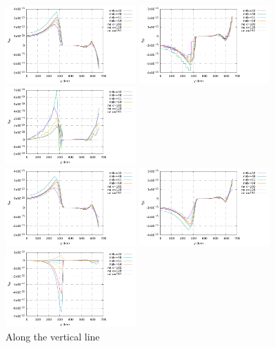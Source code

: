 \begin{center}
\includegraphics[width=5cm]{python_codes/fieldstone_26/results/case1b/vertical_exx.pdf}
\includegraphics[width=5cm]{python_codes/fieldstone_26/results/case1b/vertical_eyy.pdf}
\includegraphics[width=5cm]{python_codes/fieldstone_26/results/case1b/vertical_exy.pdf}\\
\includegraphics[width=5cm]{python_codes/fieldstone_26/results/case1b/vertical_exxn.pdf}
\includegraphics[width=5cm]{python_codes/fieldstone_26/results/case1b/vertical_eyyn.pdf}
\includegraphics[width=5cm]{python_codes/fieldstone_26/results/case1b/vertical_exyn.pdf}\\
{\captionfont Along the vertical line}
\end{center}

